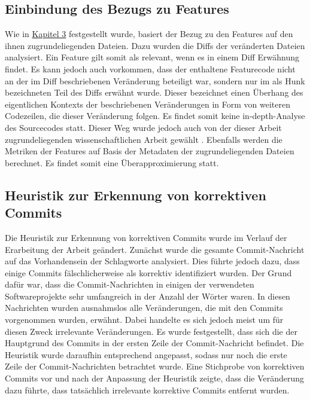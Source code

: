 \subsection*{Einbindung des Bezugs zu Features}
Wie in \hyperref[dataset-creation]{Kapitel 3} festgestellt wurde, basiert der Bezug zu den Features auf den ihnen zugrundeliegenden Dateien. Dazu wurden die Diffs der veränderten Dateien analysiert. Ein Feature gilt somit als relevant, wenn es in einem Diff Erwähnung findet. Es kann jedoch auch vorkommen, dass der enthaltene Featurecode nicht an der im Diff beschriebenen Veränderung beteiligt war, sondern nur im als \glqq Hunk\grqq{} bezeichneten Teil des Diffs erwähnt wurde. Dieser bezeichnet einen Überhang des eigentlichen Kontexts der beschriebenen Veränderungen in Form von weiteren Codezeilen, die dieser Veränderung folgen. Es findet somit keine \glqq in-depth\grqq -Analyse des Sourcecodes statt. Dieser Weg wurde jedoch auch von der dieser Arbeit zugrundeliegenden wissenschaftlichen Arbeit gewählt \cite{Queiroz2016}. Ebenfalls werden die Metriken der Features auf Basis der Metadaten der zugrundeliegenden Dateien berechnet. Es findet somit eine Überapproximierung statt.

\subsection*{Heuristik zur Erkennung von korrektiven Commits}
\label{heuristic}

Die Heuristik zur Erkennung von korrektiven Commits wurde im Verlauf der Erarbeitung der Arbeit geändert. Zunächst wurde die gesamte Commit-Nachricht auf das Vorhandensein der Schlagworte analysiert. Dies führte jedoch dazu, dass einige Commits fälschlicherweise als korrektiv identifiziert wurden. Der Grund dafür war, dass die Commit-Nachrichten in einigen der verwendeten Softwareprojekte sehr umfangreich in der Anzahl der Wörter waren. In diesen Nachrichten wurden ausnahmslos alle Veränderungen, die mit den Commits vorgenommen wurden, erwähnt. Dabei handelte es sich jedoch meist um für diesen Zweck irrelevante Veränderungen. Es wurde festgestellt, dass sich die der Hauptgrund des Commits in der ersten Zeile der Commit-Nachricht befindet. Die Heuristik wurde daraufhin entsprechend angepasst, sodass nur noch die erste Zeile der Commit-Nachrichten betrachtet wurde. Eine Stichprobe von korrektiven Commits vor und nach der Anpassung der Heuristik zeigte, dass die Veränderung dazu führte, dass tatsächlich irrelevante korrektive Commits entfernt wurden.

